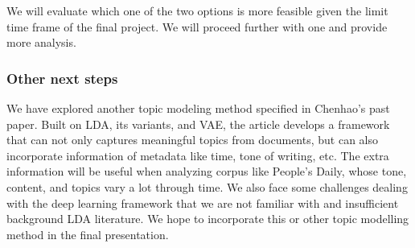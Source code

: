 \documentclass[11pt,a4paper]{article}
\begin{document}
We will evaluate which one of the two options is more feasible given the limit time frame of the final project. We will proceed further with one and provide more analysis. 



\subsubsection{Other next steps}
We have explored another topic modeling method specified in Chenhao's past paper\cite{Card_2018}. Built on LDA, its variants, and VAE, the article develops a framework that can not only captures meaningful topics from documents, but can also incorporate information of metadata like time, tone of writing, etc. The extra information will be useful when analyzing corpus like People's Daily, whose tone, content, and topics vary a lot through time. We also face some challenges dealing with the deep learning framework that we are not familiar with and insufficient background LDA literature. We hope to incorporate this or other topic modelling method in the final presentation. 





\end{document}
